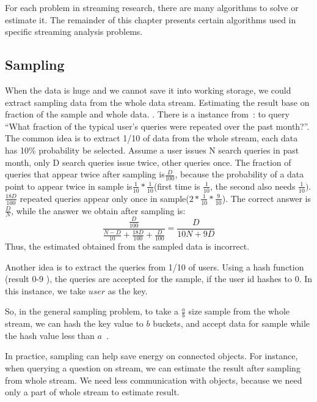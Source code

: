 For each problem in streaming research, there are many algorithms to solve or
estimate it. The remainder of this chapter presents certain algorithms used in
specific streaming analysis problems.

\subsection{Sampling}

When the data is huge and we cannot save it into working storage, we could extract
sampling data from the whole data stream. Estimating the result base on fraction
of the sample and whole data.
. There is a
instance from~\cite{leskovec2014mining}: to query ``What fraction of the typical
user's queries were repeated over the past month?''. The common idea is to
extract 1/10 of data from the whole stream, each data has 10\% probability be
selected. Assume a user issues N search queries in past month, only D search
queries issue twice, other queries once. The fraction of queries that appear twice after sampling
is$\frac{D}{100}$, because the probability of a data point to appear twice in sample
is$\frac{1}{10}*\frac{1}{10}$(first time  is $\frac{1}{10}$, the second
 also needs $\frac{1}{10})$. $\frac{18D}{100}$ repeated queries appear only
once in sample($2*\frac{1}{10}*\frac{9}{10}$). The correct answer is
$\frac{D}{N}$, while the answer we obtain after sampling is:
\begin{equation*}
    \frac{\frac{D}{100}}{\frac{N-D}{10}+\frac{18D}{100}+\frac{D}{100}} = \frac{D}{10N+9D}
\end{equation*}
Thus, the estimated obtained from the sampled data is incorrect.

Another idea is to extract the queries from 1/10 of users. Using a hash
function (result 0-9 ), the queries are accepted for the
sample, if the user id hashes to 0. In this instance, we take $user$ as the
key. 

So, in the general sampling problem, to take a $\frac{a}{b}$ size sample
from the whole stream, we can hash the key value to $b$ buckets, and accept
data for sample while the hash value less than
$a$~\cite{leskovec2014mining}.

In practice, sampling can help save energy on connected objects. For
instance, when querying a question on stream, we can estimate the result
after sampling from whole stream. We need less communication with objects,
because we need only a part of whole stream to estimate result.  

